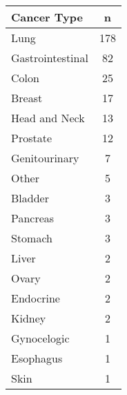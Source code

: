 \begin{tabular}{|l|c|}
\hline
\rowcolor[gray]{.85}\textbf{Cancer Type} & \textbf{    n }\\ \hline
             Lung &  178 \\ \hline
 Gastrointestinal &   82 \\ \hline
            Colon &   25 \\ \hline
           Breast &   17 \\ \hline
    Head and Neck &   13 \\ \hline
         Prostate &   12 \\ \hline
    Genitourinary &    7 \\ \hline
            Other &    5 \\ \hline
          Bladder &    3 \\ \hline
         Pancreas &    3 \\ \hline
          Stomach &    3 \\ \hline
            Liver &    2 \\ \hline
            Ovary &    2 \\ \hline
        Endocrine &    2 \\ \hline
           Kidney &    2 \\ \hline
      Gynocelogic &    1 \\ \hline
        Esophagus &    1 \\ \hline
             Skin &    1 \\ \hline
\end{tabular}